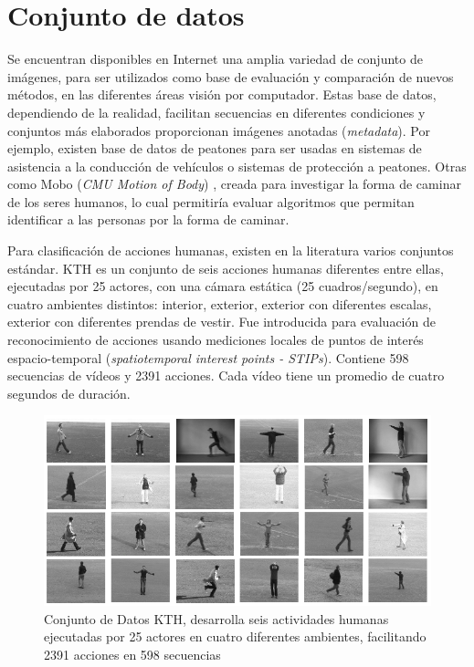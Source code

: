 \section{Conjunto de datos}

\indent Se encuentran disponibles en Internet una amplia variedad de conjunto de imágenes, para ser utilizados como base de evaluación y comparación de nuevos métodos, en las diferentes áreas visión por computador. Estas base de datos, dependiendo de la realidad, facilitan secuencias en diferentes condiciones y conjuntos más elaborados proporcionan imágenes anotadas (\textit{metadata}). Por ejemplo, existen base de datos de peatones \cite{piotr_pedestrian_2012, ess_depth_2007} para ser usadas en sistemas de asistencia a la conducción de vehículos o sistemas de protección a peatones. Otras como Mobo (\textit{CMU Motion of Body}) \cite{gross_cmu_2001}, creada para investigar la forma de caminar de los seres humanos, lo cual permitiría evaluar algoritmos que permitan identificar a las personas por la forma de caminar.

Para clasificación de acciones humanas, existen en la literatura varios conjuntos estándar. KTH \cite{schuldt_recognizing_2004} es un conjunto de seis acciones humanas diferentes entre ellas, ejecutadas por 25 actores, con una cámara estática (25 cuadros/segundo), en cuatro ambientes distintos: interior, exterior, exterior con diferentes escalas, exterior con diferentes prendas de vestir. Fue introducida para evaluación de reconocimiento de acciones usando mediciones locales de puntos de interés espacio-temporal (\textit{spatiotemporal interest points - STIPs}). Contiene 598 secuencias de vídeos y 2391 acciones. Cada vídeo tiene un promedio de cuatro segundos de duración.

\begin{figure}[h!]
\centering
\includegraphics[scale=0.5]{img/ch2/KTH}
\caption[KTH Dataset]{Conjunto de Datos KTH, desarrolla seis actividades humanas ejecutadas por 25 actores en cuatro diferentes ambientes, facilitando 2391 acciones en 598 secuencias}
\label{fig:kth}
\end{figure}



